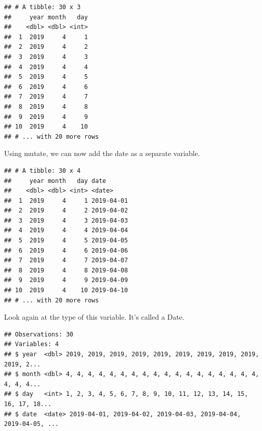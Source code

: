 \documentclass[]{tufte-book}
\newenvironment{Shaded}{}{}
\newcommand{\DataTypeTok}[1]{\textcolor[rgb]{0.56,0.13,0.00}{#1}}
\newcommand{\KeywordTok}[1]{\textcolor[rgb]{0.00,0.44,0.13}{\textbf{#1}}}
\newcommand{\NormalTok}[1]{#1}
\newcommand{\OperatorTok}[1]{\textcolor[rgb]{0.40,0.40,0.40}{#1}}
\newcommand{\StringTok}[1]{\textcolor[rgb]{0.25,0.44,0.63}{#1}}
\begin{document}
\begin{verbatim}
## # A tibble: 30 x 3
##     year month   day
##    <dbl> <dbl> <int>
##  1  2019     4     1
##  2  2019     4     2
##  3  2019     4     3
##  4  2019     4     4
##  5  2019     4     5
##  6  2019     4     6
##  7  2019     4     7
##  8  2019     4     8
##  9  2019     4     9
## 10  2019     4    10
## # ... with 20 more rows
\end{verbatim}

Using mutate, we can now add the date as a separate variable.

\begin{Shaded}
\end{Shaded}

\begin{verbatim}
## # A tibble: 30 x 4
##     year month   day date      
##    <dbl> <dbl> <int> <date>    
##  1  2019     4     1 2019-04-01
##  2  2019     4     2 2019-04-02
##  3  2019     4     3 2019-04-03
##  4  2019     4     4 2019-04-04
##  5  2019     4     5 2019-04-05
##  6  2019     4     6 2019-04-06
##  7  2019     4     7 2019-04-07
##  8  2019     4     8 2019-04-08
##  9  2019     4     9 2019-04-09
## 10  2019     4    10 2019-04-10
## # ... with 20 more rows
\end{verbatim}

Look again at the type of this variable. It's called a Date.

\begin{Shaded}
\end{Shaded}

\begin{verbatim}
## Observations: 30
## Variables: 4
## $ year  <dbl> 2019, 2019, 2019, 2019, 2019, 2019, 2019, 2019, 2019, 2019, 2...
## $ month <dbl> 4, 4, 4, 4, 4, 4, 4, 4, 4, 4, 4, 4, 4, 4, 4, 4, 4, 4, 4, 4, 4...
## $ day   <int> 1, 2, 3, 4, 5, 6, 7, 8, 9, 10, 11, 12, 13, 14, 15, 16, 17, 18...
## $ date  <date> 2019-04-01, 2019-04-02, 2019-04-03, 2019-04-04, 2019-04-05, ...
\end{verbatim}
\end{document}
